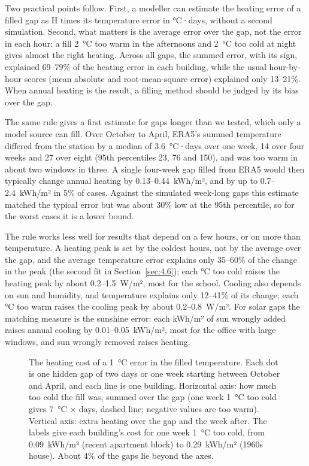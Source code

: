 Two practical points follow. First, a modeller can estimate the heating error of a filled gap as H times its temperature error in °C·days, without a second simulation. Second, what matters is the average error over the gap, not the error in each hour: a fill 2~°C too warm in the afternoons and 2~°C too cold at night gives almost the right heating. Across all gaps, the summed error, with its sign, explained 69--79\% of the heating error in each building, while the usual hour-by-hour scores (mean absolute and root-mean-square error) explained only 13--21\%. When annual heating is the result, a filling method should be judged by its bias over the gap.

The same rule gives a first estimate for gaps longer than we tested, which only a model source can fill. Over October to April, ERA5's summed temperature differed from the station by a median of 3.6~°C·days over one week, 14 over four weeks and 27 over eight (95th percentiles 23, 76 and 150), and was too warm in about two windows in three. A single four-week gap filled from ERA5 would then typically change annual heating by 0.13--0.44~kWh/m², and by up to 0.7--2.4~kWh/m² in 5\% of cases. Against the simulated week-long gaps this estimate matched the typical error but was about 30\% low at the 95th percentile, so for the worst cases it is a lower bound.

The rule works less well for results that depend on a few hours, or on more than temperature. A heating peak is set by the coldest hours, not by the average over the gap, and the average temperature error explains only 35--60\% of the change in the peak (the second fit in Section~\ref{sec:4.6}); each °C too cold raises the heating peak by about 0.2--1.5~W/m², most for the school. Cooling also depends on sun and humidity, and temperature explains only 12--41\% of its change; each °C too warm raises the cooling peak by about 0.2--0.8~W/m². For solar gaps the matching measure is the sunshine error: each kWh/m² of sun wrongly added raises annual cooling by 0.01--0.05~kWh/m², most for the office with large windows, and sun wrongly removed raises heating.

\begin{figure}[tbp]
\centering
{}
\caption{The heating cost of a 1~°C error in the filled temperature. Each dot is one hidden gap of two days or one week starting between October and April, and each line is one building. Horizontal axis: how much too cold the fill was, summed over the gap (one week 1~°C too cold gives 7~°C × days, dashed line; negative values are too warm). Vertical axis: extra heating over the gap and the week after. The labels give each building's cost for one week 1~°C too cold, from 0.09~kWh/m² (recent apartment block) to 0.29~kWh/m² (1960s house). About 4\% of the gaps lie beyond the axes.}
\label{fig:14}
\end{figure}

